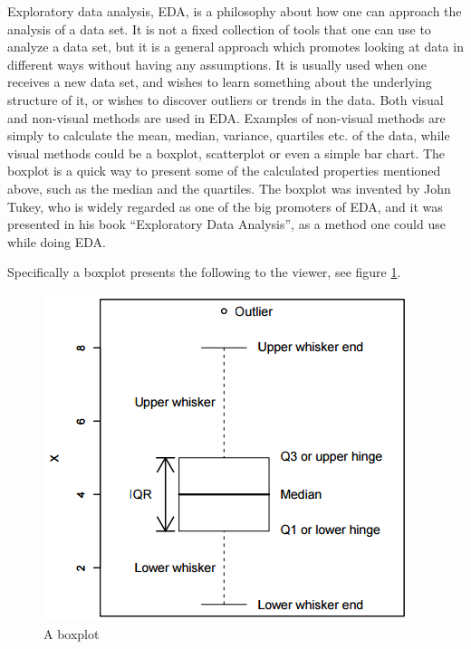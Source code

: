\documentclass[Report.tex]{subfiles}
\begin{document}
Exploratory data analysis, EDA, is a philosophy about how one can approach the analysis of a data set.
It is not a fixed collection of tools that one can use to analyze a data set, but it is a general
approach which promotes looking at data in different ways without having any assumptions. It is usually
used when one receives a new data set, and wishes to learn something about the underlying structure of it, or wishes to discover outliers or trends in the data. Both visual and non-visual methods are used
in EDA. Examples of non-visual methods are simply to calculate the mean, median, variance, quartiles etc. of
the data, while visual methods could be a boxplot, scatterplot or even a simple
bar chart. The boxplot is a quick way to present some of the calculated properties mentioned above, such as the median and the 
quartiles. The boxplot was invented by John Tukey\cite{Weimer}, who is widely regarded as one of the big promoters of EDA, and
it was presented in his book ``Exploratory Data Analysis'', as a method one could use while doing EDA.

Specifically a boxplot\cite{Seltman} presents the following to the viewer, see figure \ref{fig:boxplot}.

\begin{figure}
\center
\includegraphics[]{"Figures/boxplot"}

\caption{A boxplot\cite{Seltman}}
\label{fig:boxplot}
\end{figure}
\end{document}
